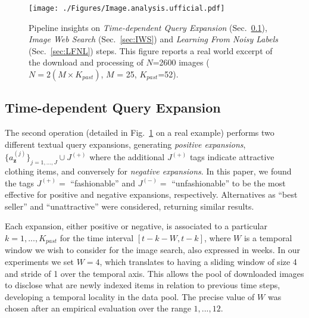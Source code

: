 \documentclass[runningheads]{llncs}
\begin{document}
\begin{figure}[t!]
	\centering
	\texttt{[image: ./Figures/Image.analysis.ufficial.pdf]}
	\caption{\footnotesize Pipeline insights on \emph{Time-dependent Query Expansion} (Sec.~\ref{sec:TDQE}), \emph{Image Web Search} (Sec.~\ref{sec:IWS}) and \emph{Learning From Noisy Labels} (Sec.~\ref{sec:LFNL}) steps. This figure reports a real world excerpt of the download and processing of $N$=2600 images ($N=2(M\times K_{past})$, $M$ = 25, $K_{past}$=52).}
	\label{fig:Image.analysis.ufficial}
\end{figure}

\subsection{Time-dependent Query Expansion}\label{sec:TDQE} The second operation (detailed in Fig.~\ref{fig:Image.analysis.ufficial} on a real example) performs two different textual query expansions, generating \emph{positive expansions}, ${\{a_\mathbf{z}^{(j)}\}}_{j=1,\ldots,J}\cup J^{(+)}$ where the additional $J^{(+)}$ tags indicate attractive clothing items, and conversely for \emph{negative expansions}. In this paper, we found the tags $J^{(+)}= $ ``fashionable'' and $J^{(-)}= $ ``unfashionable'' to be the most effective for positive and negative expansions, respectively. Alternatives as ``best seller'' and ``unattractive'' were considered, returning similar results. 

Each expansion, either positive or negative, is associated to a particular $k = 1, ...,  K_{past}$ for the time interval $[t-k-W,t-k]$, where $W$ is a temporal window we wish to consider for the image search, also expressed in weeks. In our experiments we set $W=4$, which translates to having a sliding window of size 4 and stride of 1 over the temporal axis. This allows the pool of downloaded images to disclose what are newly indexed items in relation to previous time steps, developing a temporal locality in the data pool. The precise value of $W$ was chosen after an empirical evaluation over the range $1, ..., 12$. 
\end{document}
